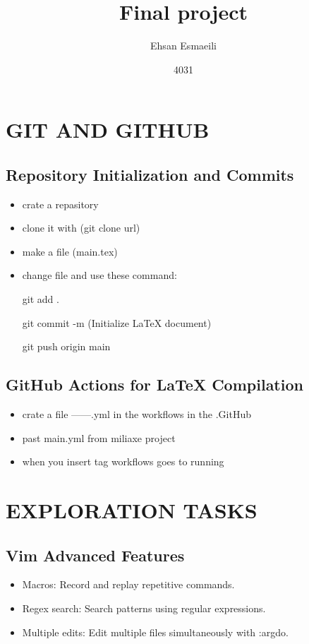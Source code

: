 \documentclass{article}
\title{Final project}
\date{4031}
\author{Ehsan Esmaeili}
\begin{document}
\maketitle
\newpage

\tableofcontents

\newpage

\section{GIT AND GITHUB}

\subsection{Repository Initialization and Commits}
\begin{itemize}
   

 \item crate a repasitory

 \item clone it with (git clone url)

 \item make a file (main.tex)

 \item change file and use these command:

  git add .

  git commit -m (Initialize LaTeX document)

  git push origin main
\end{itemize}
\subsection{GitHub Actions for LaTeX Compilation}

\begin{itemize}

\item crate a file ------.yml in the workflows in the .GitHub

\item past main.yml from miliaxe project

\item when you insert tag workflows goes to running
\end{itemize}
\newpage

\section{EXPLORATION TASKS}

\subsection{Vim Advanced Features}
\begin{itemize}

\item Macros: Record and replay repetitive commands. 

\item Regex search: Search patterns using regular expressions.

\item Multiple edits: Edit multiple files simultaneously with :argdo.
\end{itemize}
\end{document}
